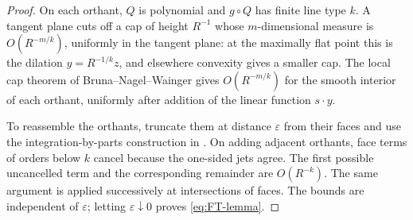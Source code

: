 \documentclass[11pt]{amsart}
\begin{document}
\begin{proof}
On each orthant, \(Q\) is polynomial and \(g\circ Q\) has finite line type
\(k\). A tangent plane cuts off a cap of height \(R^{-1}\) whose
\(m\)-dimensional measure is \(O(R^{-m/k})\), uniformly in the tangent
plane: at the maximally flat point this is the dilation
\(y=R^{-1/k}z\), and elsewhere convexity gives a smaller cap. The local
cap theorem of Bruna--Nagel--Wainger \cite[Theorems A and B]{BNW} gives
\(O(R^{-m/k})\) for the smooth interior of each orthant, uniformly after
addition of the linear function \(s\cdot y\).

To reassemble the orthants, truncate them at distance \(\varepsilon\) from
their faces and use the integration-by-parts construction in
\cite[Section~6]{BNW}. On adding adjacent orthants, face terms of orders
below \(k\) cancel because the one-sided jets agree. The first possible
uncancelled term and the corresponding remainder are \(O(R^{-k})\).
The same argument is applied successively at intersections of faces.
The bounds are independent of \(\varepsilon\); letting
\(\varepsilon\downarrow0\) proves \eqref{eq:FT-lemma}.
\end{proof}
\end{document}
